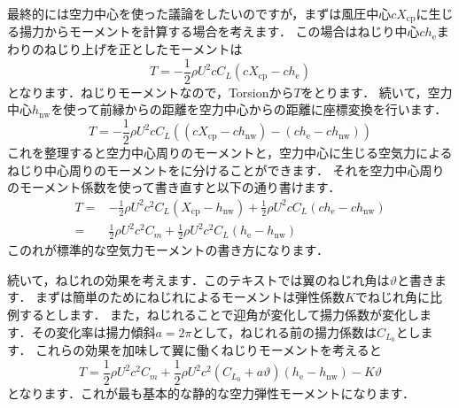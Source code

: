 \documentclass{jarticle}
\begin{document}
最終的には空力中心を使った議論をしたいのですが，まずは風圧中心$cX_\mathrm{cp}$に生じる揚力からモーメントを計算する場合を考えます．
この場合はねじり中心$ch_\mathrm{e}$まわりのねじり上げを正としたモーメントは
\begin{equation}
    T = -\frac{1}{2}\rho U^2 c C_L (cX_\mathrm{cp} - ch_\mathrm{e})
\end{equation}
となります．ねじりモーメントなので，Torsionから$T$をとります．
続いて，空力中心$h_\mathrm{nw}$を使って前縁からの距離を空力中心からの距離に座標変換を行います．
\begin{equation}
    T = -\frac{1}{2}\rho U^2 c C_L ((cX_\mathrm{cp}-ch_\mathrm{nw}) - (ch_\mathrm{e}-ch_\mathrm{nw}))
\end{equation}
これを整理すると空力中心周りのモーメントと，空力中心に生じる空気力によるねじり中心周りのモーメントをに分けることができます．
それを空力中心周りのモーメント係数を使って書き直すと以下の通り書けます．
\begin{equation}
    \begin{split}
        T =& -\frac{1}{2}\rho U^2 c^2 C_L (X_\mathrm{cp}-h_\mathrm{nw}) + \frac{1}{2}\rho U^2 c C_L  (ch_\mathrm{e}-ch_\mathrm{nw}) \\
          =& \frac{1}{2}\rho U^2 c^2 C_m + \frac{1}{2}\rho U^2 c^2 C_L  (h_\mathrm{e}-h_\mathrm{nw})
    \end{split}
\end{equation}
このれが標準的な空気力モーメントの書き方になります．

続いて，ねじれの効果を考えます．このテキストでは翼のねじれ角は$\vartheta$と書きます．
まずは簡単のためにねじれによるモーメントは弾性係数$K$でねじれ角に比例するとします．
また，ねじれることで迎角が変化して揚力係数が変化します．その変化率は揚力傾斜$a=2\pi$として，ねじれる前の揚力係数は$C_{L_0}$とします．
これらの効果を加味して翼に働くねじりモーメントを考えると
\begin{equation}
    T = \frac{1}{2}\rho U^2 c^2 C_m + \frac{1}{2}\rho U^2 c^2 (C_{L_0} + a\vartheta)  (h_\mathrm{e}-h_\mathrm{nw}) - K \vartheta
\end{equation}
となります．これが最も基本的な静的な空力弾性モーメントになります．
\end{document}
